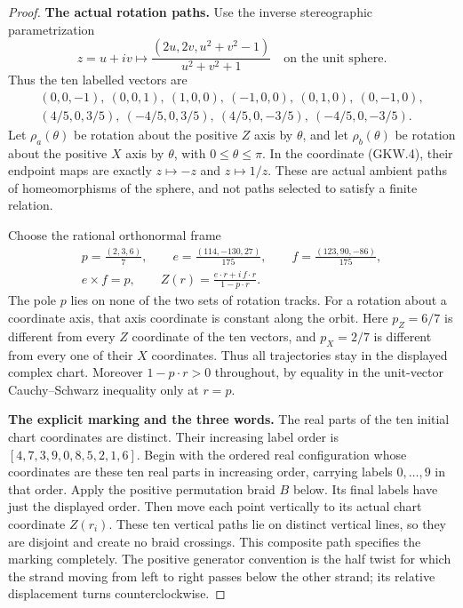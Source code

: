 \begin{proof}
\par\medskip\noindent\textbf{The actual rotation paths.}\quad
Use the inverse stereographic parametrization
\[
 z=u+iv\longmapsto
   \frac{(2u,2v,u^2+v^2-1)}{u^2+v^2+1}
       \quad\text{on the unit sphere}.
                                                               \tag{GKW.4}
\]
Thus the ten labelled vectors are
\[
\begin{gathered}
 (0,0,-1),\ (0,0,1),\
 (1,0,0),\ (-1,0,0),\
 (0,1,0),\ (0,-1,0),\\
 (4/5,0,3/5),\ (-4/5,0,3/5),\
 (4/5,0,-3/5),\ (-4/5,0,-3/5).
\end{gathered}
\]
Let $\rho_a(\theta)$ be rotation about the positive $Z$
axis by $\theta$, and let $\rho_b(\theta)$ be rotation
about the positive $X$ axis by $\theta$, with
$0\leq\theta\leq\pi$.
In the coordinate (GKW.4), their endpoint maps are exactly
$z\mapsto-z$ and $z\mapsto1/z$.
These are actual ambient paths of homeomorphisms of the
sphere, and not paths selected to satisfy a finite relation.

Choose the rational orthonormal frame
\[
\begin{gathered}
 p=\frac{(2,3,6)}7,\qquad
 e=\frac{(114,-130,27)}{175},\qquad
 f=\frac{(123,90,-86)}{175},\\
 e\times f=p,\qquad
 Z(r)=\frac{e\cdot r+i\,f\cdot r}{1-p\cdot r}.
\end{gathered}
                                                               \tag{GKW.5}
\]
The pole $p$ lies on none of the two sets of rotation
tracks.  For a rotation about a coordinate axis, that
axis coordinate is constant along the orbit.  Here
$p_Z=6/7$ is different from every $Z$ coordinate of
the ten vectors, and $p_X=2/7$ is different from every
one of their $X$ coordinates.  Thus all trajectories
stay in the displayed complex chart.  Moreover
$1-p\cdot r>0$ throughout, by equality in the unit-vector
Cauchy--Schwarz inequality only at $r=p$.

\par\medskip\noindent\textbf{The explicit marking and the three words.}\quad
The real parts of the ten initial chart coordinates are
distinct.  Their increasing label order is
$[4,7,3,9,0,8,5,2,1,6]$.
Begin with the ordered real configuration whose coordinates
are these ten real parts in increasing order, carrying
labels $0,\ldots,9$ in that order.  Apply the positive
permutation braid $B$ below.  Its final labels have just
the displayed order.  Then move each point vertically
to its actual chart coordinate $Z(r_i)$.
These ten vertical paths lie on distinct vertical lines,
so they are disjoint and create no braid crossings.
This composite path specifies the marking completely.
The positive generator convention is the half twist for
which the strand moving from left to right passes below
the other strand; its relative displacement turns
counterclockwise.


\end{proof}
